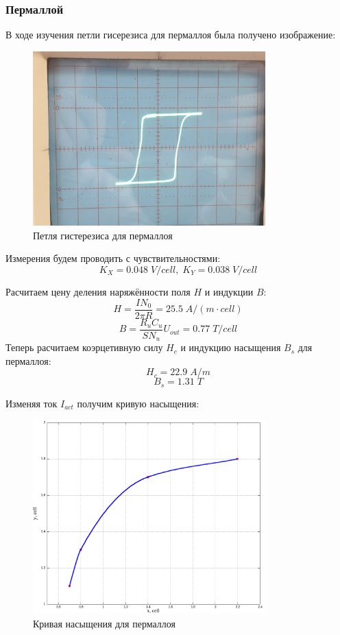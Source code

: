 \documentclass{article}
\begin{document}
\subsubsection{Пермаллой}
В ходе изучения петли гисерезиса для пермаллоя была получено изображение:
\begin{figure}[H]
    \centering
    \includegraphics[width = 0.8\textwidth]{2-1.jpg}
    \caption{Петля гистерезиса для пермаллоя}
\end{figure}

Измерения будем проводить с чувствительностями:
\[ K_X = 0.048\; V/cell,\; K_Y = 0.038\; V/cell  \]

Расчитаем цену деления наряжённости поля $H$ и индукции $B$:
\[ H = \frac{IN_0}{2\pi R} = 25.5\; A/(m\cdot cell) \]
\[ B = \frac{R_uC_u}{SN_u}U_{out} = 0.77\; T/cell \]
Теперь расчитаем коэрцетивную силу $H_c$ и индукцию насыщения $B_s$ для пермаллоя:
\[ H_c = 22.9\; A/m \]
\[ B_s = 1.31\; T \]

Изменяя ток $I_{act}$ получим кривую насыщения:
\begin{figure}[H]
    \centering
    \includegraphics[width = 0.8\textwidth]{2-d.png}
    \caption{Кривая насыщения для пермаллоя}
\end{figure}
\end{document}
